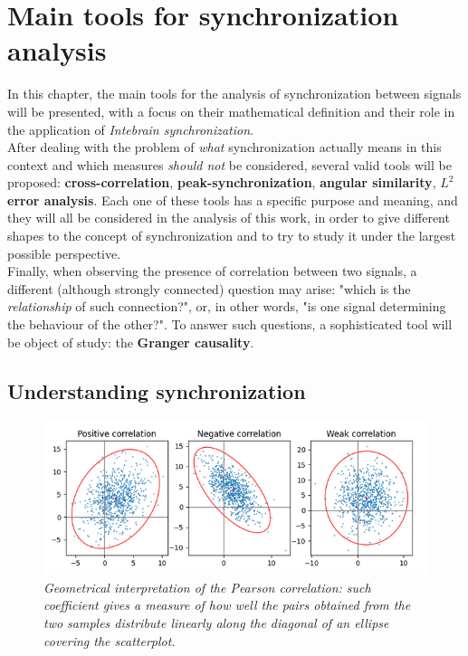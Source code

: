 \documentclass[a4paper]{article}
\begin{document}
	
	
\section{Main tools for synchronization analysis}

In this chapter, the main tools for the analysis of synchronization between signals will be presented, with a focus on their mathematical definition and their role in the application of \textit{Intebrain synchronization}.\\
After dealing with the problem of \textit{what} synchronization actually means in this context and which measures \textit{should not} be considered, several valid tools will be proposed:\textbf{ cross-correlation}, \textbf{peak-synchronization}, \textbf{angular similarity}, \textbf{$L^2$ error analysis}. Each one of these tools has a specific purpose and meaning, and they will all be considered in the analysis of this work, in order to give different shapes to the concept of synchronization and to try to study it under the largest possible perspective.\\
Finally, when observing the presence of correlation between two signals, a different (although strongly connected) question may arise: "which is the \textit{relationship} of such connection?", or, in other words, "is one signal determining the behaviour of the other?". To answer such questions, a sophisticated tool will be object of study: the \textbf{Granger causality}.


\subsection{Understanding synchronization}

\begin{figure}[H]
	\begin{center}
		\includegraphics[scale=.75]{pearson.png} 
	\end{center} 
	\caption{\textit{Geometrical interpretation of the Pearson correlation: such coefficient gives a measure of how well the pairs obtained from the two samples distribute linearly along the diagonal of an ellipse covering the scatterplot. }}
	
\end{figure}
\end{document}
